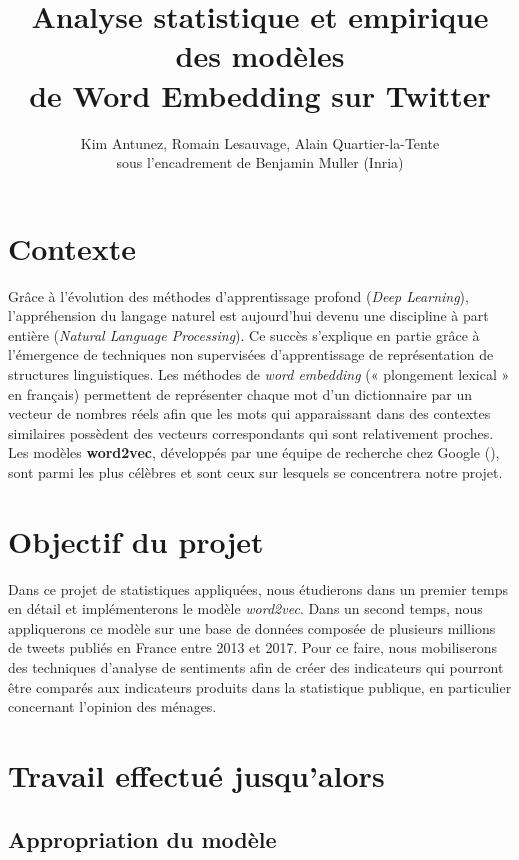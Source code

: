 \documentclass[11pt,french,french]{article}
\title{Analyse statistique et empirique des modèles\\
de Word Embedding sur Twitter}
\author{Kim Antunez, Romain Lesauvage, Alain Quartier-la-Tente\\
sous l'encadrement de Benjamin Muller (Inria)}
\date{}
\begin{document}
\maketitle


\hypertarget{contexte}{%
\section{Contexte}\label{contexte}}

Grâce à l'évolution des méthodes d'apprentissage profond (\emph{Deep
Learning}), l'appréhension du langage naturel est aujourd'hui devenu une
discipline à part entière (\emph{Natural Language Processing}). Ce
succès s'explique en partie grâce à l'émergence de techniques non
supervisées d'apprentissage de représentation de structures
linguistiques. Les méthodes de \emph{word embedding} (« plongement
lexical » en français) permettent de représenter chaque mot d'un
dictionnaire par un vecteur de nombres réels afin que les mots qui
apparaissant dans des contextes similaires possèdent des vecteurs
correspondants qui sont relativement proches. Les modèles
\textbf{word2vec}, développés par une équipe de recherche chez Google
(\cite{Mikolov}), sont parmi les plus célèbres et sont ceux sur lesquels
se concentrera notre projet.

\hypertarget{objectif-du-projet}{%
\section{Objectif du projet}\label{objectif-du-projet}}

Dans ce projet de statistiques appliquées, nous étudierons dans un
premier temps en détail et implémenterons le modèle \emph{word2vec}.
Dans un second temps, nous appliquerons ce modèle sur une base de
données composée de plusieurs millions de tweets publiés en France entre
2013 et 2017. Pour ce faire, nous mobiliserons des techniques d'analyse
de sentiments afin de créer des indicateurs qui pourront être comparés
aux indicateurs produits dans la statistique publique, en particulier
concernant l'opinion des ménages.

\hypertarget{travail-effectuuxe9-jusqualors}{%
\section{Travail effectué
jusqu'alors}\label{travail-effectuuxe9-jusqualors}}

\hypertarget{appropriation-du-moduxe8le}{%
\subsection{Appropriation du modèle}\label{appropriation-du-moduxe8le}}
\end{document}
